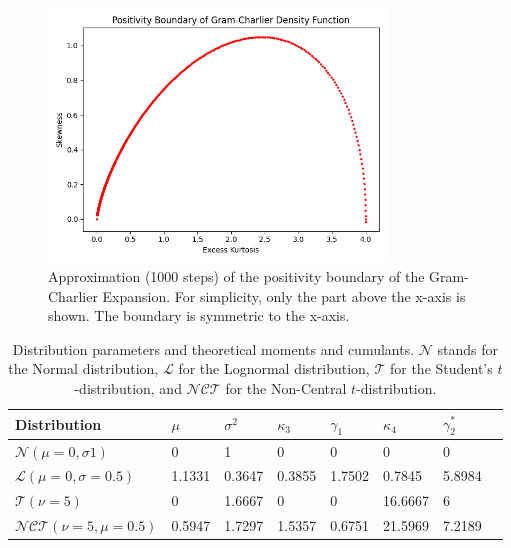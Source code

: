 \begin{figure}[h]
    \centering
    \includegraphics[width=0.8\textwidth]{img/gc_positivity_boundary.png}
    \caption{Approximation (1000 steps) of the positivity boundary of the Gram-Charlier Expansion. For simplicity, only the part above the x-axis is shown. The boundary is symmetric to the x-axis.}
    \label{fig:gram_charlier_boundary}
\end{figure}

\begin{table}[h]
    \centering
    \begin{tabular}{l|l|l|l|l|l|l|l}
        Distribution & $\mu$ & $\sigma^2$ & $\kappa_3$ & $\gamma_1$ & $\kappa_4$ & $\gamma_2^*$ \\
        \hline
        $\mathcal{N}(\mu=0,\sigma1)$ & 0 & 1 & 0 & 0 & 0 & 0 \\
        $\mathcal{L}(\mu=0, \sigma=0.5)$ & 1.1331 & 0.3647 & 0.3855 & 1.7502 & 0.7845 & 5.8984 \\
        $\mathcal{T}(\nu=5)$ & 0 & 1.6667 & 0 & 0 & 16.6667 & 6 \\
        $\mathcal{NCT}(\nu=5, \mu=0.5)$ & 0.5947 & 1.7297 & 1.5357 & 0.6751 & 21.5969 & 7.2189
    \end{tabular}
    \caption{Distribution parameters and theoretical moments and cumulants. $\mathcal{N}$ stands for the Normal distribution, $\mathcal{L}$ for the Lognormal distribution, $\mathcal{T}$ for the Student's $t$-distribution, and $\mathcal{NCT}$ for the Non-Central $t$-distribution.}
    \label{table:distributions_theoretical_moments}
\end{table}

